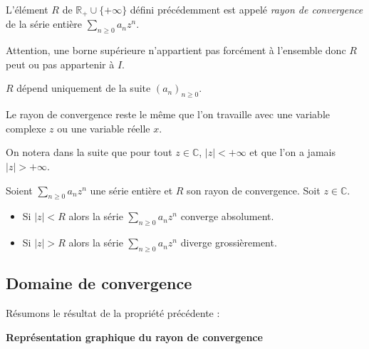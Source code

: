 \documentclass[a4paper,10pt]{report}
\newcommand{\Sum}[2]{\ensuremath{\textstyle{\sum\limits_{#1}^{#2}}}}
\begin{document}
\begin{defin} L'élément $R$ de $\mathbb{R}_+ \cup \lbrace + \infty \rbrace$ défini précédemment est appelé \textit{rayon de convergence} de la série entière $\Sum{n \geq 0}{} a_n z^n$.
\end{defin}

\begin{rems}
\item Attention, une borne supérieure n'appartient pas forcément à l'ensemble donc $R$ peut ou pas appartenir à $I$.
\item $R$ dépend uniquement de la suite $(a_n)_{n \geq 0}$.
\item Le rayon de convergence reste le même que l'on travaille avec une variable complexe $z$ ou une variable réelle $x$.
\item On notera dans la suite que pour tout $z \in \mathbb{C}$, $ \vert z \vert < + \infty$ et que l'on a jamais $\vert z \vert > + \infty$.
\end{rems}

\begin{prop} Soient $\Sum{n \geq 0}{} a_n z^n$ une série entière et $R$ son rayon de convergence. Soit $z \in \mathbb{C}$.

\begin{itemize}
\item Si $\vert z \vert < R$ alors la série $\Sum{n \geq 0}{} a_n z^n$ converge absolument.
\item Si $\vert z \vert > R$ alors la série $\Sum{n \geq 0}{} a_n z^n$ diverge grossièrement.
\end{itemize}
\end{prop}

\begin{preuve}
\vspace{3cm}
\end{preuve}

\subsection{Domaine de convergence}
\noindent Résumons le résultat de la propriété précédente : 

\begin{center}
\textbf{Représentation graphique du rayon de convergence}
\end{center}

\vspace{4cm}
\end{document}
